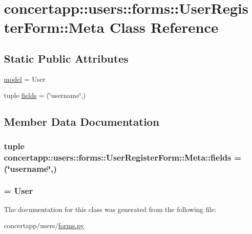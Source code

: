 \hypertarget{classconcertapp_1_1users_1_1forms_1_1_user_register_form_1_1_meta}{
\section{concertapp::users::forms::UserRegisterForm::Meta Class Reference}
\label{classconcertapp_1_1users_1_1forms_1_1_user_register_form_1_1_meta}
}
\subsection*{Static Public Attributes}
\begin{DoxyCompactItemize}
\item 
\hyperlink{classconcertapp_1_1users_1_1forms_1_1_user_register_form_1_1_meta_afb5639221d10b2605749aeffba589298}{model} = User
\item 
tuple \hyperlink{classconcertapp_1_1users_1_1forms_1_1_user_register_form_1_1_meta_a196e6562e7e1b55c8838facc3615a5c6}{fields} = (\char`\"{}username\char`\"{},)
\end{DoxyCompactItemize}


\subsection{Member Data Documentation}
\hypertarget{classconcertapp_1_1users_1_1forms_1_1_user_register_form_1_1_meta_a196e6562e7e1b55c8838facc3615a5c6}{
\subsubsection[{fields}]{\setlength{\rightskip}{0pt plus 5cm}tuple {\bf concertapp::users::forms::UserRegisterForm::Meta::fields} = (\char`\"{}username\char`\"{},)}}
\label{classconcertapp_1_1users_1_1forms_1_1_user_register_form_1_1_meta_a196e6562e7e1b55c8838facc3615a5c6}
\hypertarget{classconcertapp_1_1users_1_1forms_1_1_user_register_form_1_1_meta_afb5639221d10b2605749aeffba589298}{
\subsubsection[{model}]{ = User}}
\label{classconcertapp_1_1users_1_1forms_1_1_user_register_form_1_1_meta_afb5639221d10b2605749aeffba589298}


The documentation for this class was generated from the following file:\begin{DoxyCompactItemize}
\item 
concertapp/users/\hyperlink{users_2forms_8py}{forms.py}\end{DoxyCompactItemize}
